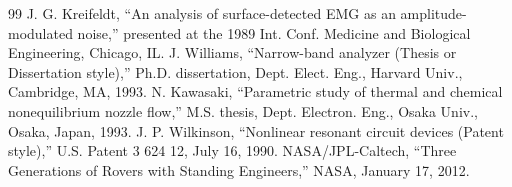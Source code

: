 \documentclass[letterpaper, 10 pt, conference]{ieeeconf}  %
\begin{document}
\begin{thebibliography}{99}
 J. G. Kreifeldt, ``An analysis of surface-detected EMG as an amplitude-modulated noise,'' presented at the 1989 Int. Conf. Medicine and Biological Engineering, Chicago, IL.
 J. Williams, ``Narrow-band analyzer (Thesis or Dissertation style),'' Ph.D. dissertation, Dept. Elect. Eng., Harvard Univ., Cambridge, MA, 1993. 
 N. Kawasaki, ``Parametric study of thermal and chemical nonequilibrium nozzle flow,'' M.S. thesis, Dept. Electron. Eng., Osaka Univ., Osaka, Japan, 1993.
 J. P. Wilkinson, ``Nonlinear resonant circuit devices (Patent style),'' U.S. Patent 3 624 12, July 16, 1990. 
 NASA/JPL-Caltech, ``Three Generations of Rovers with Standing Engineers,'' NASA, January 17, 2012. 






\end{thebibliography}
\end{document}
